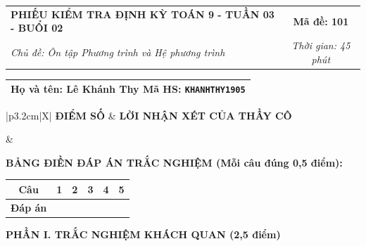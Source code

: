 \documentclass[12pt,a4paper]{article}
\begin{document}
\newpage



\noindent
\begin{tabularx}{\linewidth}{|X|c|}
\hline
\textbf{PHIẾU KIỂM TRA ĐỊNH KỲ TOÁN 9 - TUẦN 03 - BUỔI 02} & \textbf{Mã đề: 101} \\
\textit{Chủ đề: Ôn tập Phương trình và Hệ phương trình} & \textit{Thời gian: 45 phút} \\
\hline
\end{tabularx}

\vspace{1mm}

\noindent
\begin{tabularx}{\linewidth}{|X|}
\hline
\rule[-2mm]{0pt}{7.5mm}\textbf{Họ và tên:} \textbf{\large Lê Khánh Thy} \hfill \textbf{Mã HS:} \texttt{KHANHTHY1905} \quad \\
\hline
\end{tabularx}

\vspace{1mm}

\noindent
\begin{tabularx}{\linewidth}{|p{3.2cm}|X|}
\hline
\centering\textbf{ĐIỂM SỐ} & \centering\textbf{LỜI NHẬN XÉT CỦA THẦY CÔ} \tabularnewline
\hline
\rule{0pt}{1.3cm} & \tabularnewline
\hline
\end{tabularx}

\vspace{1.2mm}

\noindent\textbf{BẢNG ĐIỀN ĐÁP ÁN TRẮC NGHIỆM (Mỗi câu đúng 0,5 điểm):}
\vspace{0.8mm}

\noindent
\renewcommand{\arraystretch}{1.35}
\begin{tabularx}{\linewidth}{|c|*{5}{>{\centering\arraybackslash}X|}}
\hline
\textbf{Câu} & \textbf{1} & \textbf{2} & \textbf{3} & \textbf{4} & \textbf{5} \\
\hline
\textbf{Đáp án} & & & & & \\
\hline
\end{tabularx}
\renewcommand{\arraystretch}{1.0}

\vspace{1.5mm}

\noindent\textbf{\large PHẦN I. TRẮC NGHIỆM KHÁCH QUAN (2,5 điểm)}
\vspace{1mm}
\end{document}
